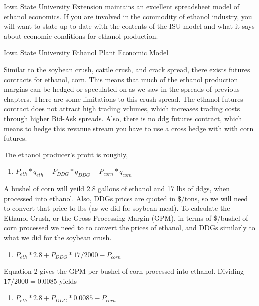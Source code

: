 \documentclass[
]{book}
\providecommand{\tightlist}{%
  \setlength{\itemsep}{0pt}\setlength{\parskip}{0pt}}
\begin{document}
Iowa State University Extension maintains an excellent spreadsheet model of ethanol economics. If you are involved in the commodity of ethanol industry, you will want to state up to date with the contents of the ISU model and what it says about economic conditions for ethanol production.

\href{https://www.extension.iastate.edu/agdm/articles/hof/HofJan08.html}{Iowa State University Ethanol Plant Economic Model}

Similar to the soybean crush, cattle crush, and crack spread, there exists futures contracts for ethanol, corn. This means that much of the ethanol production margins can be hedged or speculated on as we saw in the spreads of previous chapters. There are some limitations to this crush spread. The ethanol futures contract does not attract high trading volumes, which increases trading costs through higher Bid-Ask spreads. Also, there is no ddg futures contract, which means to hedge this revanue stream you have to use a cross hedge with with corn futures.

The ethanol producer's profit is roughly,

\begin{enumerate}
\def\labelenumi{\arabic{enumi}.}
\tightlist
\item
  \(P_{eth}*q_{eth} + P_{DDG}*q_{DDG} - P_{corn}*q_{corn}\)
\end{enumerate}

A bushel of corn will yeild 2.8 gallons of ethanol and 17 lbs of ddgs, when processed into ethanol. Also, DDGs prices are quoted in \$/tons, so we will need to convert that price to lbs (as we did for soybean meal). To calculate the Ethanol Crush, or the Gross Processing Margin (GPM), in terms of \$/bushel of corn processed we need to to convert the prices of ethanol, and DDGs similarly to what we did for the soybean crush.

\begin{enumerate}
\def\labelenumi{\arabic{enumi}.}
\setcounter{enumi}{1}
\tightlist
\item
  \(P_{eth}*2.8 + P_{DDG}*17/2000 - P_{corn}\)
\end{enumerate}

Equation 2 gives the GPM per bushel of corn processed into ethanol. Dividing \(17/2000 = 0.0085\) yields

\begin{enumerate}
\def\labelenumi{\arabic{enumi}.}
\setcounter{enumi}{2}
\tightlist
\item
  \(P_{eth}*2.8 + P_{DDG}*0.0085 - P_{corn}\)
\end{enumerate}
\end{document}
